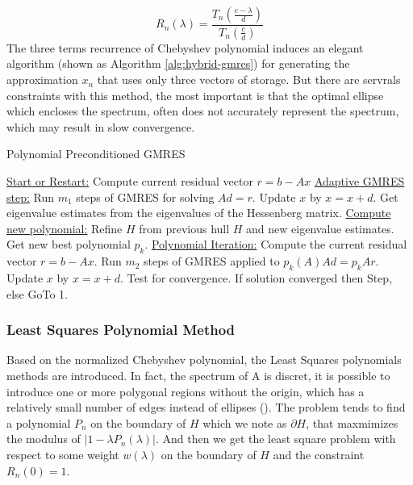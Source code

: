 \begin{equation}
R_n(\lambda)=\frac{T_n(\frac{c-\lambda}{d})}{ T_n (\frac{c}{d})}
\end{equation}
The three terms recurrence of Chebyshev polynomial induces an elegant algorithm (shown as Algorithm \ref{alg:hybrid-gmres}) for generating the approximation \(x_n\) that uses only three vectors of storage. But there are servrals constraints with this method, the most important is that the optimal ellipse which encloses the spectrum, often does not accurately represent the spectrum, which may result in slow convergence.

\begin{algorithm}[htbp]
	\caption{Polynomial Preconditioned GMRES}
	\label{alg:hybrid-gmres}
	\begin{algorithmic}[1]
		\State \underline{Start or Restart:}
		\State \hspace{16pt} Compute current residual vector $r=b-Ax$
		\State \underline{Adaptive GMRES step:}
		\State \hspace{16pt} Run $m_1$ steps of GMRES for solving $Ad = r$.
		\State \hspace{16pt} Update $x$ by $x=x+d$.
		\State \hspace{16pt} Get eigenvalue estimates from the eigenvalues of the Hessenberg matrix.
		\State \underline{Compute new polynomial:}
		\State \hspace{16pt} Refine $H$ from previous hull $H$ and new eigenvalue estimates.
		\State \hspace{16pt} Get new best polynomial $p_k$.
		\State \underline{Polynomial Iteration:}
		\State \hspace{16pt} Compute the current residual vector $r= b-Ax$.
		\State \hspace{16pt} Run $m_2$ steps of GMRES applied to $p_k(A)Ad=p_k{A}r$.
		\State \hspace{16pt} Update $x$ by $x=x+d$.
		\State \hspace{16pt} Test for convergence.
		\State \hspace{16pt} If solution converged then Step, else GoTo 1.
	\end{algorithmic}
\end{algorithm}

\subsubsection{Least Squares Polynomial Method}

Based on the normalized Chebyshev polynomial, the Least Squares polynomials methods are introduced. In fact, the spectrum of A is discret, it is possible to introduce one or more polygonal regions without the origin, which has a relatively small number of edges instead of ellipses (\cite{smolarski1982optimum}). The problem tends to find a polynomial \(P_n\) on the boundary of \(H\) which we note as \(\partial H\), that maxmimizes the modulus of \(|1-\lambda P_n(\lambda)|\). And then we get the least square problem with respect to some weight \(w(\lambda)\) on the boundary of \(H\) and the constraint \(R_n(0)=1\).

